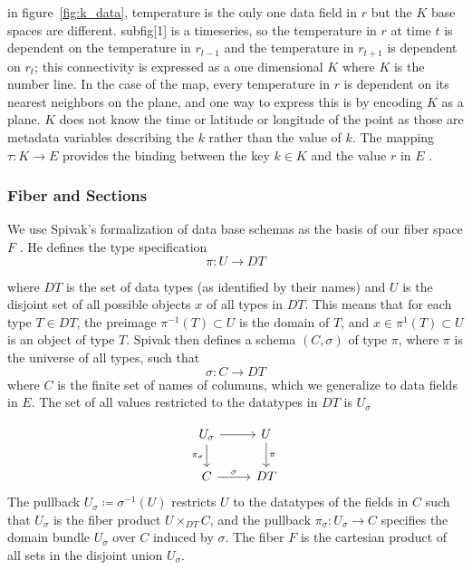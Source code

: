 \documentclass[../main.tex]{subfiles}
\begin{document}
in figure~\ref{fig:k_data}, temperature is the only one data field in $r$ but the $K$ base spaces are different. subfig[1] is a timeseries, so the temperature in $r$ at time $t$ is dependent on the temperature in $r_{t-1}$ and the temperature in $r_{t+1}$ is dependent on  $r_t$; this connectivity is expressed as a one dimensional $K$ where $K$ is the number line. In the case of the map, every temperature in $r$ is dependent on its nearest neighbors on the plane, and one way to express this is by encoding $K$ as a plane. $K$ does not know the time or latitude or longitude of the point as those are metadata variables describing the $k$ rather than the value of $k$. The mapping $\tau: K \rightarrow E$ provides the binding between the key $k \in K$ and the value $r$ in $E$ \cite{munznerChDataAbstraction}.

\subsubsection{Fiber and Sections}
\label{sec:data_fiber}
We use Spivak's formalization of data base schemas as the basis of our fiber space $F$ \cite{spivakSIMPLICIALDATABASES}. He defines the type specification 
\begin{equation}
\pi: U \rightarrow DT
\end{equation}

where $DT$ is the set of data types (as identified by their names) and $U$ is the disjoint set of all possible objects $x$ of all types in $DT$. This means that for each type $T\in DT$, the preimage $\pi^{-1}(T)\subset U $ is the domain of $T$, and $x \in \pi^{1}(T)\subset U$ is an object of type $T$. Spivak then defines a schema $(C, \sigma)$ of type $\pi$, where $\pi$ is the universe of all types, such that 
\begin{equation}
\sigma: C \rightarrow DT
\end{equation}
where $C$ is the finite set of names of columuns, which we generalize to data fields in $E$. The set of all values restricted to the datatypes in $DT$ is $U_{\sigma}$

\begin{equation}
    \begin{tikzcd}
        U_{\sigma} \arrow[d, "\pi_{\sigma}"'] \arrow[r] & U \arrow[d, "\pi"] \\
        C \arrow[r, "\sigma"]                           & DT                
    \end{tikzcd}
\end{equation}
The pullback $U_{\sigma} \coloneqq \sigma^{-1}(U)$ restricts $U$ to the datatypes of the fields in $C$ such that $U_{\sigma}$ is the fiber product $U \times_{DT} C$, and the pullback $\pi_{\sigma}:U_{\sigma} \rightarrow C$ specifies the domain bundle $U_{\sigma}$ over $C$ induced by $\sigma$. The fiber $F$ is the cartesian product of all sets in the disjoint union $U_{\sigma}$. 
\end{document}
